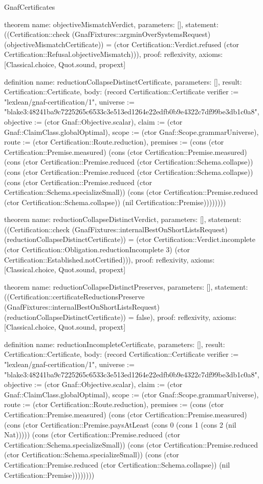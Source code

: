 \begin{lexlean}{GnafCertificates}
\begin{semanticmodule}
theorem{
  name: objectiveMismatchVerdict,
  parameters: [],
  statement: ((Certification::check (GnafFixtures::argminOverSystemsRequest) (objectiveMismatchCertificate)) = (ctor Certification::Verdict.refused (ctor Certification::Refusal.objectiveMismatch))),
  proof: reflexivity{},
  axioms: [Classical.choice, Quot.sound, propext]
}

definition{
  name: reductionCollapseDistinctCertificate,
  parameters: [],
  result: Certification::Certificate,
  body: (record Certification::Certificate {verifier := "lexlean/gnaf-certification/1", universe := "blake3:48241ba9c7225265c6533c3e513ed1264e22edfb0b9e4322c7df99be3db1c0a8", objective := (ctor Gnaf::Objective.scalar), claim := (ctor Gnaf::ClaimClass.globalOptimal), scope := (ctor Gnaf::Scope.grammarUniverse), route := (ctor Certification::Route.reduction), premises := (cons (ctor Certification::Premise.measured) (cons (ctor Certification::Premise.measured) (cons (ctor Certification::Premise.reduced (ctor Certification::Schema.collapse)) (cons (ctor Certification::Premise.reduced (ctor Certification::Schema.collapse)) (cons (ctor Certification::Premise.reduced (ctor Certification::Schema.specializeSmall)) (cons (ctor Certification::Premise.reduced (ctor Certification::Schema.collapse)) (nil Certification::Premise)))))))})
}

theorem{
  name: reductionCollapseDistinctVerdict,
  parameters: [],
  statement: ((Certification::check (GnafFixtures::internalBestOnShortListsRequest) (reductionCollapseDistinctCertificate)) = (ctor Certification::Verdict.incomplete (ctor Certification::Obligation.reductionIncomplete 3) (ctor Certification::Established.notCertified))),
  proof: reflexivity{},
  axioms: [Classical.choice, Quot.sound, propext]
}

theorem{
  name: reductionCollapseDistinctPreserves,
  parameters: [],
  statement: ((Certification::certificateReductionsPreserve (GnafFixtures::internalBestOnShortListsRequest) (reductionCollapseDistinctCertificate)) = false),
  proof: reflexivity{},
  axioms: [Classical.choice, Quot.sound, propext]
}

definition{
  name: reductionIncompleteCertificate,
  parameters: [],
  result: Certification::Certificate,
  body: (record Certification::Certificate {verifier := "lexlean/gnaf-certification/1", universe := "blake3:48241ba9c7225265c6533c3e513ed1264e22edfb0b9e4322c7df99be3db1c0a8", objective := (ctor Gnaf::Objective.scalar), claim := (ctor Gnaf::ClaimClass.globalOptimal), scope := (ctor Gnaf::Scope.grammarUniverse), route := (ctor Certification::Route.reduction), premises := (cons (ctor Certification::Premise.measured) (cons (ctor Certification::Premise.measured) (cons (ctor Certification::Premise.paysAtLeast (cons 0 (cons 1 (cons 2 (nil Nat))))) (cons (ctor Certification::Premise.reduced (ctor Certification::Schema.specializeSmall)) (cons (ctor Certification::Premise.reduced (ctor Certification::Schema.specializeSmall)) (cons (ctor Certification::Premise.reduced (ctor Certification::Schema.collapse)) (nil Certification::Premise)))))))})
}


\end{semanticmodule}
\end{lexlean}
